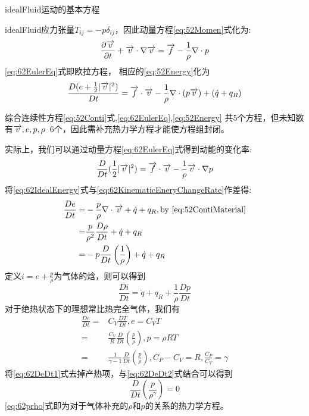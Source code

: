 
\gls{idealFluid}运动的基本方程

\gls{idealFluid}应力张量$T_{ij}=-p\delta_{ij}$，因此动量方程\eqref{eq:52Momen}式化为:
\begin{equation}\label{eq:62EulerEq}
 \frac{\partial \overrightarrow{v}}{\partial t}+\overrightarrow{v}\cdot\nabla\overrightarrow{v}=\overrightarrow{f}-\frac{1}{\rho}\nabla\cdot p
\end{equation}
\eqref{eq:62EulerEq}式即欧拉方程，
相应的\eqref{eq:52Energy}化为
\begin{equation}\label{eq:62IdealEnergy}
 \frac{D(e+\frac{1}{2}|\overrightarrow{v}|^2)}{Dt}=
 \overrightarrow{f}\cdot\overrightarrow{v}-\frac{1}{\rho}\nabla\cdot(p\overrightarrow{v})+(\dot{q}+q_R) 
\end{equation}

综合连续性方程\eqref{eq:52Conti}式,\eqref{eq:62EulerEq},\eqref{eq:52Energy}
共5个方程，但未知数有$\overrightarrow{v},e,p,\rho\,$ 6个，因此需补充热力学方程才能使方程组封闭。

实际上，我们可以通过动量方程\eqref{eq:62EulerEq}式得到动能的变化率:
\begin{equation}\label{eq:62KinematicEneryChangeRate}
\frac{D}{D t}(\frac{1}{2}|\overrightarrow{v}|^2)=\overrightarrow{f}\cdot \overrightarrow{v}-\frac{1}{\rho}\overrightarrow{v}\cdot\nabla p
\end{equation}
将\eqref{eq:62IdealEnergy}式与\eqref{eq:62KinematicEneryChangeRate}作差得:
\begin{align}
\frac{De}{Dt}= & -\frac{p}{\rho} \nabla \cdot \overrightarrow{v} + \dot{q}+q_R ,\text{by }\eqref{eq:52ContiMaterial}\nonumber\\
=& \frac{p}{\rho^2}\frac{D\rho}{Dt} + \dot{q}+q_R \nonumber\\
=& -p\frac{D}{Dt}\left(\frac{1}{\rho}\right) + \dot{q}+q_R\label{eq:62DeDt1}
\end{align}
定义$i=e+\frac{p}{\rho}$为气体的焓，则可以得到
\begin{equation}\label{eq:62Enthalpy}
\frac{D i}{D t}=\dot{q}+q_R + \frac{1}{\rho} \frac{D p }{D t}
\end{equation}
对于绝热状态下的理想常比热完全气体，我们有
\begin{align}
\frac{D e}{D t}=& C_V \frac{D T}{D t},e=C_V T\nonumber\\
=& \frac{C_V}{R} \frac{D}{D t}\left(\frac{p}{\rho}\right),p=\rho RT\nonumber\\
=& \frac{1}{\gamma -1} \frac{D}{D t}\left(\frac{p}{\rho}\right),C_P-C_V=R,\frac{C_P}{C_V}=\gamma \label{eq:62DeDt2}
\end{align}
将\eqref{eq:62DeDt1}式去掉产热项，与\eqref{eq:62DeDt2}式结合可以得到
\begin{equation}\label{eq:62prho}
\frac{D}{D t}\left(\frac{p}{\rho^{\gamma}}\right)=0
\end{equation}
\eqref{eq:62prho}式即为对于气体补充的$\rho$和$p$的关系的热力学方程。

